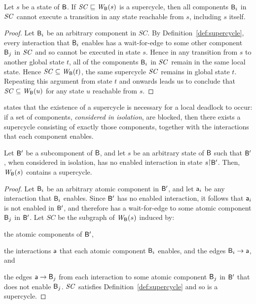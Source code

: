 \begin{proposition}
\label{prop:static:supercycle-is-sufficient}
Let $s$ be a state of $\mathsf{B}$.
If $\mathit{SC} \sqsubseteq \mathit{W}_{\mathsf{B}}({s})$ is a supercycle, then all components $\mathsf{B}_i$ in $\mathit{SC}$ cannot execute a transition in any state reachable
from $s$, including $s$ itself.
\end{proposition}
%
\begin{proof}
Let $\mathsf{B}_i$ be an arbitrary component in $SC$. By Definition~\ref{def:supercycle}, every interaction that $\mathsf{B}_i$ enables
has a wait-for-edge to some other component $\mathsf{B}_j$ in $\mathit{SC}$ and so cannot be executed in state $s$. Hence in any
transition from $s$ to another global state $t$, all of the components $\mathsf{B}_i$ in $\mathit{SC}$ remain in the same local state. 
Hence $\mathit{SC} \subseteq \mathit{W}_{\mathsf{B}}({t})$, \ie the same supercycle $\mathit{SC}$ remains in global state $t$. Repeating this argument from state $t$
and onwards leads us to conclude that $\mathit{SC} \subseteq \mathit{W}_{\mathsf{B}}({u})$ for any state $u$ reachable from $s$.
\end{proof}

 states that the
existence of a supercycle is necessary for a local deadlock to occur:
if a set of components, \emph{considered in isolation}, are blocked,
then there exists a supercycle consisting of exactly those components,
together with the interactions that each component enables.
%
\begin{proposition}
\label{prop:static:supercycle-is-necessary} 
\label{prop:supercycle-is-necessary}
Let $\mathsf{B}'$ be a subcomponent of $\mathsf{B}$, and
let $s$ be an arbitrary state of $\mathsf{B}$ such that $\mathsf{B}'$,
when considered in isolation, has no enabled interaction in state $s \pj \B'$.
%
Then, $\mathit{W}_{\mathsf{B}}({s})$ contains a supercycle.
\end{proposition}
%
%
\begin{proof}
Let $\mathsf{B}_i$ be an arbitrary atomic component in $\mathsf{B}'$, and let $\mathsf{a}_i$ be any interaction that $\mathsf{B}_i$ enables. Since $\mathsf{B}'$ has no
enabled interaction, it follows that $\mathsf{a}_i$ is not enabled in $\mathsf{B}'$, and
therefore has a wait-for-edge to some atomic component $\mathsf{B}_j$ in
$\mathsf{B}'$. Let $SC$ be the subgraph of $\mathit{W}_{\mathsf{B}}({s})$ induced by:
\bn
\item the atomic components of $\mathsf{B}'$, 
\item the interactions $\mathsf{a}$ that each atomic component $\mathsf{B}_i$ enables,
     and the edges $\mathsf{B}_i \rightarrow \mathsf{a}$, and
\item  the edges $\mathsf{a} \rightarrow \mathsf{B}_j$ from each interaction to some atomic
     component $\mathsf{B}_j$ in $\mathsf{B}'$ that does not enable $\mathsf{B}_j$.
\en
$\mathit{SC}$ satisfies Definition~\ref {def:supercycle} and so is a supercycle.
\end{proof}

